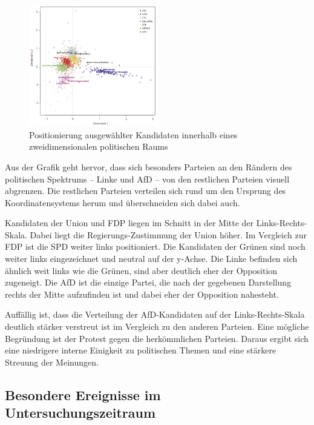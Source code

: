 \begin{figure}[H]
    \centering
    \includegraphics[width=0.5\textwidth]{data/images/positionierung_ausgewaehlter_kandidaten.png}
    \caption[Positionierung ausgewählter Kandidaten \autocite{saltzer_bundestagswahl_2022}]{Positionierung ausgewählter Kandidaten innerhalb eines zweidimensionalen politischen Raums \autocite{saltzer_bundestagswahl_2022}} \label{fig:positionierungAusgewaehlterKanidaten}
\end{figure}

Aus der Grafik geht hervor, dass sich besonders Parteien an den Rändern des politischen Spektrums -- Linke und \ac{AfD} -- von den restlichen Parteien visuell abgrenzen. Die restlichen Parteien verteilen sich rund um den Ursprung des Koordinatensystems herum und überschneiden sich dabei auch.

Kandidaten der Union und \ac{FDP} liegen im Schnitt in der Mitte der Links-Rechts-Skala. Dabei liegt die Regierungs-Zustimmung der Union höher. Im Vergleich zur \ac{FDP} ist die \ac{SPD} weiter links positioniert. Die Kandidaten der Grünen sind noch weiter links eingezeichnet und neutral auf der y-Achse. Die Linke befinden sich ähnlich weit links wie die Grünen, sind aber deutlich eher der Opposition zugeneigt. Die \ac{AfD} ist die einzige Partei, die nach der gegebenen Darstellung rechts der Mitte aufzufinden ist und dabei eher der Opposition nahesteht.

Auffällig ist, dass die Verteilung der \ac{AfD}-Kandidaten auf der Links-Rechts-Skala deutlich stärker verstreut ist im Vergleich zu den anderen Parteien. Eine mögliche Begründung ist der Protest gegen die herkömmlichen Parteien. Daraus ergibt sich eine niedrigere interne Einigkeit zu politischen Themen und eine stärkere Streuung der Meinungen.

\subsection{Besondere Ereignisse im Untersuchungszeitraum} \label{subsec:besondereEreignisse}


